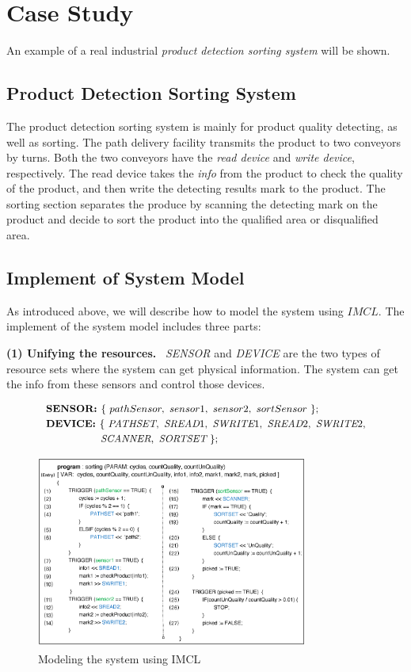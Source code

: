\section{Case Study}
An example of a real industrial \emph{product detection sorting system} will be shown.

\subsection{Product Detection Sorting System}
The product detection sorting system is mainly for product quality detecting, as well as sorting. The path delivery facility transmits the product to two conveyors by turns. Both the two conveyors have the \emph{read device} and \emph{write device}, respectively. The read device takes the \emph{info} from the product to check the quality of the product, and then write the detecting results mark to the product. The sorting section separates the produce by scanning the detecting mark on the product and decide to sort the product into the qualified area or disqualified area.


\subsection{Implement of System Model}
As introduced above, we will describe how to model the system using $IMCL$. The implement of the system model includes three parts:

\textbf{(1) Unifying the resources.} \ \emph{SENSOR} and \emph{DEVICE} are the two types of resource sets where the system can get physical information. The system can get the info from these sensors and control those devices.

\begin{equation*}
\footnotesize
    \begin{aligned}
       & \textbf{SENSOR: }  \{ \ pathSensor, \ sensor1, \ sensor2, \ sortSensor \ \}; \\
       & \textbf{DEVICE: }  \{ \ \emph{PATHSET}, \ \emph{SREAD}1, \ \emph{SWRITE}1, \ \emph{SREAD}2, \ \emph{SWRITE}2, \\
       & \ \ \ \ \ \ \ \ \ \ \ \ \ \ \ \ \emph{SCANNER}, \ \emph{SORTSET} \ \};
    \end{aligned}
\end{equation*}

\begin{figure}[!htb]
    \centering
        \includegraphics[height=2.5in, width=3.5in]{fig_IMCL_code}
    \caption{Modeling the system using IMCL}\label{fig_IMCL_code}
\end{figure}

